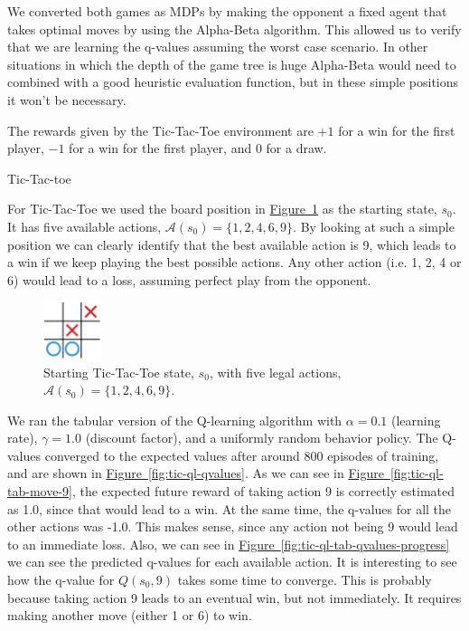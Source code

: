 \documentclass{article}
\newcommand{\GithubURL}[1]{[\href{https://github.com/davidrobles/mlnd-capstone-code/blob/master/#1}{source}]}
\begin{document}
We converted both games as MDPs by making the opponent a fixed agent that takes optimal moves by
using the Alpha-Beta algorithm. This allowed us to verify that we are learning the q-values assuming
the worst case scenario. In other situations in which the depth of the game tree is huge Alpha-Beta
would need to combined with a good heuristic evaluation function, but in these simple positions it
won't be necessary.

The rewards given by the Tic-Tac-Toe environment are $+1$ for a win for the first player, $-1$ for a
win for the first player, and $0$ for a draw.


Tic-Tac-toe



For Tic-Tac-Toe we used the board position in \hyperref[fig:tic-ql-tab-cur]
{Figure~\ref*{fig:tic-ql-tab-cur}} as the starting state, $s_0$. It has five available actions,
$\mathcal{A}(s_0) = \{1, 2, 4, 6, 9\}$. By looking at such a simple position we can clearly identify
that the best available action is 9, which leads to a win if we keep playing the best possible
actions. Any other action (i.e. 1, 2, 4 or 6) would lead to a loss, assuming perfect play from the
opponent.

\begin{figure}[!h]
    \centering
    \includegraphics[width=0.15\textwidth]{figures/tic_ql_tab_current.pdf}
    \caption{Starting Tic-Tac-Toe state, $s_0$, with five legal actions, $\mathcal{A}(s_0) = \{1, 2, 4, 6, 9\}$.}
    \label{fig:tic-ql-tab-cur}
\end{figure}

We ran the tabular version of the Q-learning algorithm with $\alpha = 0.1$ (learning rate),
$\gamma=1.0$ (discount factor), and a uniformly random behavior policy. The Q-values converged to
the expected values after around 800 episodes of training, and are shown in
\hyperref[fig:tic-ql-qvalues] {Figure~\ref*{fig:tic-ql-qvalues}}. As we can see in
\hyperref[fig:tic-ql-tab-move-9] {Figure~\ref*{fig:tic-ql-tab-move-9}}, the expected future reward
of taking action 9 is correctly estimated as 1.0, since that would lead to a win. At the same time,
the q-values for all the other actions was -1.0. This makes sense, since any action not being 9
would lead to an immediate loss. Also, we can see in \hyperref[fig:tic-ql-tab-qvalues-progress]
{Figure~\ref*{fig:tic-ql-tab-qvalues-progress}} we can see the predicted q-values for each available
action. It is interesting to see how the q-value for $Q(s_0, 9)$ takes some time to converge. This
is probably because taking action 9 leads to an eventual win, but not immediately. It requires
making another move (either 1 or 6) to win.
\end{document}
